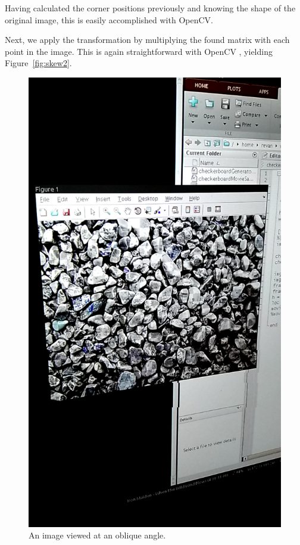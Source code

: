 \documentclass[11pt, letterpaper]{article}
\begin{document}
Having calculated the corner positions previously and knowing the shape of the original image, this is easily accomplished with OpenCV\cite{opencv_getperspectivetransform}.

Next, we apply the transformation by multiplying the found matrix with each point in the image.
This is again straightforward with OpenCV \cite{opencv_warpperspective}, yielding Figure~\ref{fig:skew2}.

\begin{figure}[hbtp]
\centering
\includegraphics[scale=0.10]{img/skew.png}
\caption{An image viewed at an oblique angle.}
\label{fig:skew}
\end{figure}
\end{document}
